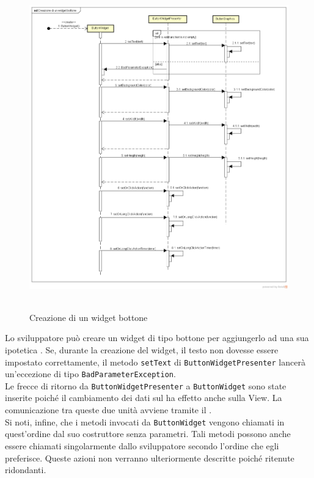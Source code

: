 \label{Creazione di un widget bottone}
\begin{figure}[H]
	\centering
	\includegraphics[width=16cm, height=14cm]{Sezioni/Diagrammi/SDK/Creazione di un widget bottone.png}
	\caption{Creazione di un widget bottone}
\end{figure}

Lo sviluppatore può creare un widget di tipo bottone per aggiungerlo ad una sua ipotetica . Se, durante la creazione del widget, il testo non dovesse essere impostato correttamente, il metodo \texttt{setText} di \texttt{ButtonWidgetPresenter} lancerà un'eccezione di tipo \texttt{BadParameterException}. \\
Le frecce di ritorno da \texttt{ButtonWidgetPresenter}  a \texttt{ButtonWidget} sono state inserite poiché il cambiamento dei dati sul  ha effetto anche sulla View. La comunicazione tra queste due unità avviene tramite il  . \\
Si noti, infine, che i metodi invocati da \texttt{ButtonWidget} vengono chiamati in quest'ordine dal suo costruttore senza parametri. Tali metodi possono anche essere chiamati singolarmente dallo sviluppatore secondo l'ordine che egli preferisce. Queste azioni non verranno ulteriormente descritte poiché ritenute ridondanti.

